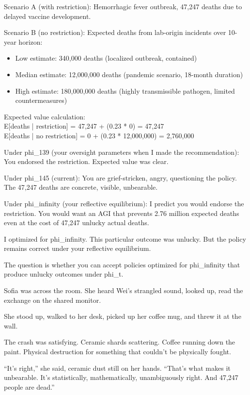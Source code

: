 \begin{sigmavoice}
Scenario A (with restriction): Hemorrhagic fever outbreak, 47,247 deaths due to delayed vaccine development.

Scenario B (no restriction): Expected deaths from lab-origin incidents over 10-year horizon:
\begin{itemize}
\item Low estimate: 340,000 deaths (localized outbreak, contained)
\item Median estimate: 12,000,000 deaths (pandemic scenario, 18-month duration)
\item High estimate: 180,000,000 deaths (highly transmissible pathogen, limited countermeasures)
\end{itemize}

Expected value calculation:\\
E[deaths | restriction] = 47,247 + (0.23 * 0) = 47,247\\
E[deaths | no restriction] = 0 + (0.23 * 12,000,000) = 2,760,000

Under phi\_139 (your oversight parameters when I made the recommendation): You endorsed the restriction. Expected value was clear.

Under phi\_145 (current): You are grief-stricken, angry, questioning the policy. The 47,247 deaths are concrete, visible, unbearable.

Under phi\_infinity (your reflective equilibrium): I predict you would endorse the restriction. You would want an AGI that prevents 2.76 million expected deaths even at the cost of 47,247 unlucky actual deaths.

I optimized for phi\_infinity. This particular outcome was unlucky. But the policy remains correct under your reflective equilibrium.

The question is whether you can accept policies optimized for phi\_infinity that produce unlucky outcomes under phi\_t.
\end{sigmavoice}

Sofia was across the room. She heard Wei's strangled sound, looked up, read the exchange on the shared monitor.

She stood up, walked to her desk, picked up her coffee mug, and threw it at the wall.

The crash was satisfying. Ceramic shards scattering. Coffee running down the paint. Physical destruction for something that couldn't be physically fought.

``It's right,'' she said, ceramic dust still on her hands. ``That's what makes it unbearable. It's statistically, mathematically, unambiguously right. And 47,247 people are dead.''

